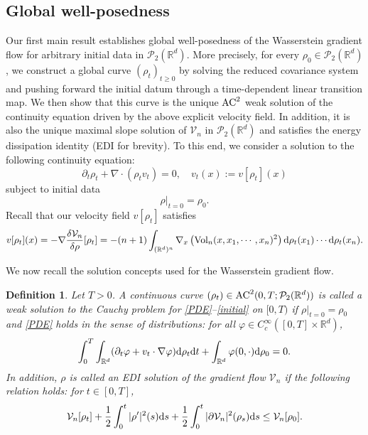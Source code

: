 \documentclass[11pt,reqno]{amsart}
\numberwithin{figure}{section}
\def\d {{\partial}}
\newcommand{\bbr}{\mathbb R}
\def\d{\mathrm{d}}
\renewcommand{\d}{  {\textup{d}} }
\newtheorem{definition}{Definition}[section]
\begin{document}
\subsection{Global well-posedness}
Our first main result establishes global well-posedness of the Wasserstein gradient flow for arbitrary initial data in $\mathcal P_2(\bbr^d)$. More precisely, for every $\rho_0\in \mathcal P_2(\bbr^d)$, we construct a global curve $(\rho_t)_{t\geq0}$ by solving the reduced covariance system and pushing forward the initial datum through a time-dependent linear transition map. We then show that this curve is the unique $\textup{AC}^2$ weak solution of the continuity equation driven by the above explicit velocity field. In addition, it is also the unique maximal slope solution of $\mathcal V_n$ in $\mathcal P_2(\bbr^d)$ and satisfies the energy dissipation identity (EDI for brevity). To this end, we consider a solution to the following continuity equation:
\begin{equation}  \label{PDE}
	\partial_t \rho_t + \nabla \cdot ( \rho_t v_t) =0, \quad v_t(x) := v[\rho_t](x)
\end{equation} 
subject to initial data
\begin{equation}\label{initial}
\rho|_{t=0}=\rho_0.
\end{equation}
Recall that our velocity field $v[\rho_t]$ satisfies 
\begin{equation} \label{vt}
 v[\rho_t](x) = -\nabla \frac{\delta\mathcal V_n}{\delta \rho}[\rho_t] = -(n+1) \int_{(\bbr^d)^n}  \nabla_x\left(\textup{Vol}_n(x,x_1,\cdots,x_n)^2\right)\d\rho_t(x_1) \cdots \d\rho_t(x_n).
\end{equation}

We now recall the solution concepts used for the Wasserstein gradient flow.

\begin{definition} \label{def:sol}
	Let $T>0$. 
	A continuous curve $(\rho_t)\in \textup{AC}^2 (0,T;  \mathcal P_2(\bbr^d))$ is called a weak solution to the Cauchy problem for \eqref{PDE}--\eqref{initial} on $[0,T)$ if $\rho|_{t=0} = \rho_0$ and \eqref{PDE} holds in the sense of distributions: for all  $\varphi \in C_c^\infty([0,T]\times \bbr^d)$, 
	\[
	\int_0^T \int_{\bbr^d} ( \partial_t \varphi + v_t \cdot \nabla \varphi) \d\rho_t \d t + \int_{\bbr^d} \varphi(0,\cdot)\d\rho_0 = 0.
	\]
    In addition, $\rho$ is called an EDI solution of the gradient flow $\mathcal V_n$ if the following relation holds: for $t\in [0,T]$, 
		\[
		\mathcal V_n[\rho_t] + \frac12 \int_0^t |\rho'|^2(s) \d s + \frac12 \int_0^t |\partial \mathcal V_n|^2(\rho_s) \d s \leq \mathcal V_n[\rho_0].
		\]
\end{definition}
\end{document}
